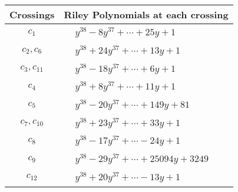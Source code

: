 \documentclass[1p]{elsarticle_modified}
\theoremstyle{definition}
\begin{document}
\begin{tabular}{m{50pt}|m{274pt}}
Crossings & \hspace{64pt}Riley Polynomials at each crossing \\
\hline $$\begin{aligned}c_{1}\end{aligned}$$&$\begin{aligned}
&y^{38}-8 y^{37}+\cdots+25 y+1
\end{aligned}$\\
\hline $$\begin{aligned}c_{2},c_{6}\end{aligned}$$&$\begin{aligned}
&y^{38}+24 y^{37}+\cdots+13 y+1
\end{aligned}$\\
\hline $$\begin{aligned}c_{3},c_{11}\end{aligned}$$&$\begin{aligned}
&y^{38}-18 y^{37}+\cdots+6 y+1
\end{aligned}$\\
\hline $$\begin{aligned}c_{4}\end{aligned}$$&$\begin{aligned}
&y^{38}+8 y^{37}+\cdots+11 y+1
\end{aligned}$\\
\hline $$\begin{aligned}c_{5}\end{aligned}$$&$\begin{aligned}
&y^{38}-20 y^{37}+\cdots+149 y+81
\end{aligned}$\\
\hline $$\begin{aligned}c_{7},c_{10}\end{aligned}$$&$\begin{aligned}
&y^{38}+23 y^{37}+\cdots+33 y+1
\end{aligned}$\\
\hline $$\begin{aligned}c_{8}\end{aligned}$$&$\begin{aligned}
&y^{38}-17 y^{37}+\cdots-24 y+1
\end{aligned}$\\
\hline $$\begin{aligned}c_{9}\end{aligned}$$&$\begin{aligned}
&y^{38}-29 y^{37}+\cdots+25094 y+3249
\end{aligned}$\\
\hline $$\begin{aligned}c_{12}\end{aligned}$$&$\begin{aligned}
&y^{38}+20 y^{37}+\cdots-13 y+1
\end{aligned}$\\
\hline
\end{tabular}\\~\\
\end{document}
